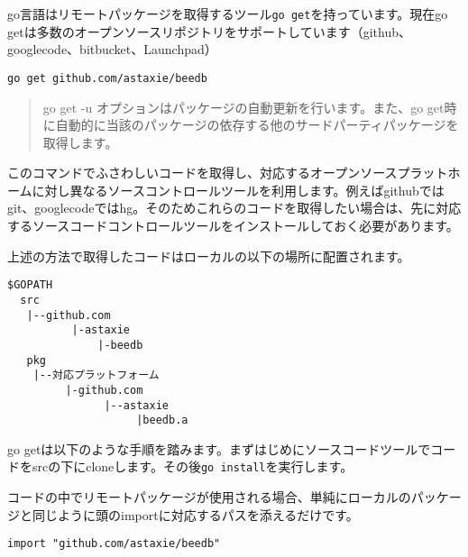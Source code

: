 go言語はリモートパッケージを取得するツール\texttt{go get}を持っています。現在go getは多数のオープンソースリポジトリをサポートしています（github、googlecode、bitbucket、Launchpad）

\begin{lstlisting}[numbers=none]
go get github.com/astaxie/beedb
\end{lstlisting}

\begin{quote}
go get -u オプションはパッケージの自動更新を行います。また、go get時に自動的に当該のパッケージの依存する他のサードパーティパッケージを取得します。
\end{quote}

このコマンドでふさわしいコードを取得し、対応するオープンソースプラットホームに対し異なるソースコントロールツールを利用します。例えばgithubではgit、googlecodeではhg。そのためこれらのコードを取得したい場合は、先に対応するソースコードコントロールツールをインストールしておく必要があります。

上述の方法で取得したコードはローカルの以下の場所に配置されます。

\begin{lstlisting}[numbers=none]
$GOPATH
  src
   |--github.com
          |-astaxie
              |-beedb
   pkg
    |--対応プラットフォーム
         |-github.com
               |--astaxie
                    |beedb.a
\end{lstlisting}

go getは以下のような手順を踏みます。まずはじめにソースコードツールでコードをsrcの下にcloneします。その後\texttt{go install}を実行します。

コードの中でリモートパッケージが使用される場合、単純にローカルのパッケージと同じように頭のimportに対応するパスを添えるだけです。



\begin{lstlisting}[numbers=none]
import "github.com/astaxie/beedb"
\end{lstlisting}


